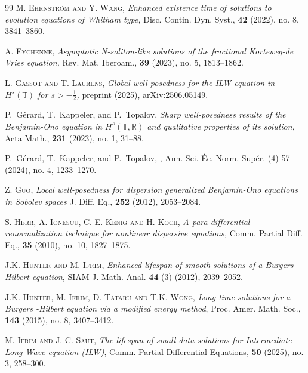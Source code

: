 \documentclass{amsart}
\theoremstyle{definition}
\theoremstyle{remark}
\numberwithin{equation}{section}
\begin{document}
\begin{thebibliography}{99}
 \textsc{M. Ehrnstr\"om and Y. Wang,}
\newblock \emph{Enhanced existence time of solutions to evolution equations of Whitham type,}
\newblock Disc. Contin. Dyn. Syst., {\bf 42} (2022), no. 8, 3841--3860.

 \textsc{A. Eychenne,}
\newblock \emph{Asymptotic  N-soliton-like solutions of the fractional Korteweg-de Vries equation,}
\newblock Rev. Mat. Iberoam., {\bf 39} (2023), no. 5, 1813--1862.

\newblock \textsc{L. Gassot and T. Laurens},
\newblock \emph{Global well-posedness for the ILW equation in $H^s(\mathbb T)$ for $s>-\frac12$,}
\newblock preprint (2025), arXiv:2506.05149.

{\sc P.~G{\'e}rard, T.~Kappeler, and P.~Topalov}, {\em Sharp well-posedness
  results of the {B}enjamin-{O}no equation in $H^s(\mathbb{T},\mathbb{R})$ and
  qualitative properties of its solution}, 
  \newblock Acta Math., {\bf 231} (2023), no. 1, 31--88.
  
{\sc P.~G{\'e}rard, T.~Kappeler, and P.~Topalov}, 
, 
 \newblock Ann. Sci. \'Ec. Norm. Sup\'er. (4) 57 (2024), no. 4, 1233--1270.


\newblock \textsc{Z. Guo,}
\newblock \emph{Local well-posedness for dispersion generalized Benjamin-Ono equations in Sobolev spaces}
\newblock J. Diff. Eq., \textbf{252} (2012), 2053--2084.


\newblock \textsc{S. Herr, A. Ionescu, C. E. Kenig and H. Koch,}
\newblock \emph{A para-differential renormalization technique for nonlinear dispersive equations,}
\newblock  Comm. Partial Diff. Eq., \textbf{35} (2010), no. 10, 1827--1875.

\textsc{J.K. Hunter and M. Ifrim},
\newblock \emph{Enhanced lifespan of smooth solutions of a Burgers-Hilbert equation}, 
\newblock SIAM J. Math. Anal. {\bf 44} (3) (2012), 2039--2052.

 \textsc{J.K. Hunter, M. Ifrim, D. Tataru and T.K. Wong}, 
{\it Long time solutions for a Burgers -Hilbert equation via a modified energy method}, 
Proc. Amer. Math. Soc., {\bf 143} (2015), no. 8, 3407--3412.

\textsc{M. Ifrim and J.-C. Saut}, 
\newblock \emph{The lifespan of small data solutions for Intermediate Long Wave
equation (ILW)}, 
\newblock Comm. Partial Differential Equations, {\bf 50} (2025), no. 3, 258--300.


\end{thebibliography}
\end{document}

